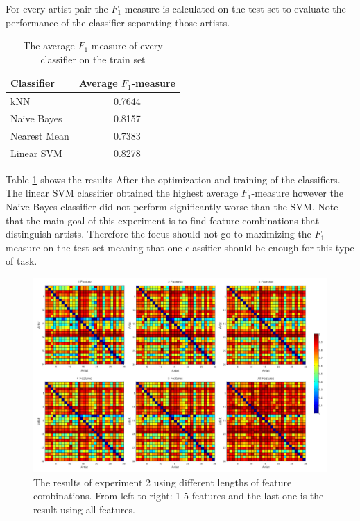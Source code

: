 For every artist pair the $F_1$-measure is calculated on the test set to evaluate the performance of the classifier separating those artists.


\begin{table}[htb]
    \centering
    \begin{tabular}
        { | l | c |} 
        \hline
        Classifier & Average $F_1$-measure  \\
        \hline
        kNN & 0.7644 \\ 
        Naive Bayes & 0.8157 \\ 
        Nearest Mean & 0.7383 \\ 
        Linear SVM & 0.8278 \\ 
        \hline 
    \end{tabular}
    \caption{The average $F_1$-measure of every classifier on the train set}
    \label{ex2optimizeresults}
\end{table}

Table \ref{ex2optimizeresults} shows the results After the optimization and training of the classifiers.
The linear SVM classifier obtained the highest average $F_1$-measure however the Naive Bayes classifier did not perform significantly worse than the SVM.
Note that the main goal of this experiment is to find feature combinations that distinguish artists.
Therefore the focus should not go to maximizing the $F_1$-measure on the test set meaning that one classifier should be enough for this type of task.

\begin{figure}[htb]
  \centering
  \includegraphics[width=1\linewidth]{img/experiment2results.png}
  \caption{The results of experiment 2 using different lengths of feature combinations. From left to right: 1-5 features and the last one is the result using all features.}
  \label{fig:experiment2results}
\end{figure}

